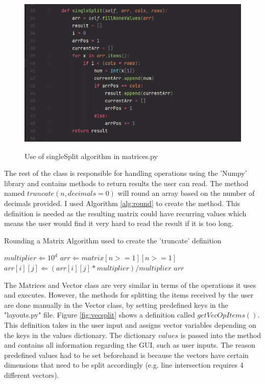 \documentclass[final]{cmpreport}
\begin{document}
	\begin{figure}[H]
		\caption{Use of singleSplit algorithm in matrices.py}
		\centering
		\includegraphics[scale=0.7]{singlesplit.png}
		\label{fig:single}
	\end{figure}
	The rest of the class is responsible for handling operations using the 'Numpy' library and contains methods to return results the user can read. The method named $truncate(n, decimals=0)$ will round an array based on the number of decimals provided. I used Algorithm \ref{alg:round} to create the method. This definition is needed as the resulting matrix could have recurring values which means the user would find it very hard to read the result if it is too long. 	
	\begin{algorithm}
		\caption{Rounding a Matrix Algorithm used to create the 'truncate' definition}\label{alg:round}
		\begin{algorithmic}[3]
			\State $multiplier \Leftarrow 10^d$
			\State $arr \Leftarrow matrix[n>=1][n>=1]$
			\State $arr[i][j] \Leftarrow (arr[i][j]*multiplier)/multiplier$
			\EndFor
			\EndFor
			\Return $arr$
			\EndProcedure			
		\end{algorithmic}
	\end{algorithm}

	The Matrices and Vector class are very similar in terms of the operations it uses and executes. However, the methods for splitting the items received by the user are done manually in the Vector class, by setting predefined keys in the "layouts.py" file. Figure \ref{fig:vecsplit} shows a definition called $getVecOpItems()$. This definition takes in the user input and assigns vector variables depending on the keys in the values dictionary. The dictionary $values$ is passed into the method and contains all information regarding the GUI, such as user inputs. The reason predefined values had to be set beforehand is because the vectors have certain dimensions that need to be split accordingly (e.g. line intersection requires 4 different vectors).
	
\end{document}
